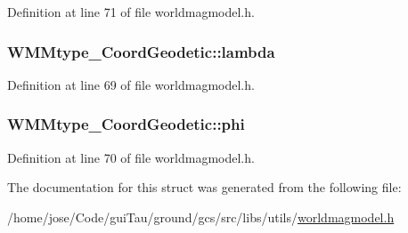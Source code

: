 Definition at line 71 of file worldmagmodel.\-h.

\hypertarget{struct_w_m_mtype___coord_geodetic_ae94dc806d0564cca00a63db68e594225}{
\subsubsection[{lambda}]{ W\-M\-Mtype\-\_\-\-Coord\-Geodetic\-::lambda}}\label{struct_w_m_mtype___coord_geodetic_ae94dc806d0564cca00a63db68e594225}


Definition at line 69 of file worldmagmodel.\-h.

\hypertarget{struct_w_m_mtype___coord_geodetic_afa72809b75b6c5675ffb657d6a85420a}{
\subsubsection[{phi}]{ W\-M\-Mtype\-\_\-\-Coord\-Geodetic\-::phi}}\label{struct_w_m_mtype___coord_geodetic_afa72809b75b6c5675ffb657d6a85420a}


Definition at line 70 of file worldmagmodel.\-h.



The documentation for this struct was generated from the following file\-:\begin{DoxyCompactItemize}
\item 
/home/jose/\-Code/gui\-Tau/ground/gcs/src/libs/utils/\hyperlink{worldmagmodel_8h}{worldmagmodel.\-h}\end{DoxyCompactItemize}
